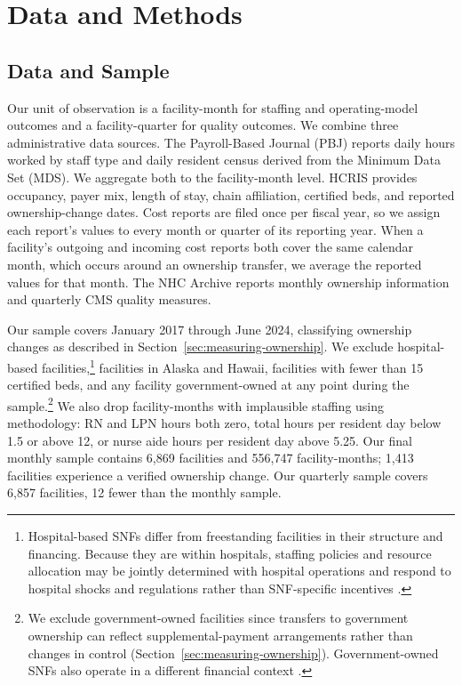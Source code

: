\documentclass[12pt]{article}
\begin{document}
\section{Data and Methods} \label{sec:dataandmethods}

\subsection{Data and Sample} \label{sec:dataandsample}

Our unit of observation is a facility-month for staffing and operating-model outcomes and a facility-quarter for quality outcomes. We combine three administrative data sources. The Payroll-Based Journal (PBJ) reports daily hours worked by staff type and daily resident census derived from the Minimum Data Set (MDS). We aggregate both to the facility-month level. HCRIS provides occupancy, payer mix, length of stay, chain affiliation, certified beds, and reported ownership-change dates. Cost reports are filed once per fiscal year, so we assign each report's values to every month or quarter of its reporting year. When a facility's outgoing and incoming cost reports both cover the same calendar month, which occurs around an ownership transfer, we average the reported values for that month. The NHC Archive reports monthly ownership information and quarterly CMS quality measures.

Our sample covers January 2017 through June 2024, classifying ownership changes as described in Section~\ref{sec:measuring-ownership}. We exclude hospital-based facilities,\footnote{Hospital-based SNFs differ from freestanding facilities in their structure and financing. Because they are within hospitals, staffing policies and resource allocation may be jointly determined with hospital operations and respond to hospital shocks and regulations rather than SNF-specific incentives \citep{MedPAC2026Report}.} facilities in Alaska and Hawaii, facilities with fewer than 15 certified beds, and any facility government-owned at any point during the sample.\footnote{We exclude government-owned facilities since transfers to government ownership can reflect supplemental-payment arrangements rather than changes in control (Section~\ref{sec:measuring-ownership}). Government-owned SNFs also operate in a different financial context \citep{MedPAC2026Report}.} We also drop facility-months with implausible staffing using \citet{cms_fivestar_2026} methodology: RN and LPN hours both zero, total hours per resident day below 1.5 or above 12, or nurse aide hours per resident day above 5.25. Our final monthly sample contains 6,869 facilities and 556,747 facility-months; 1,413 facilities experience a verified ownership change. Our quarterly sample covers 6,857 facilities, 12 fewer than the monthly sample.
\end{document}
